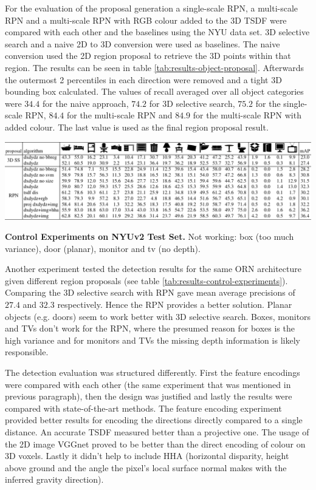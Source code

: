 \documentclass[12pt]{scrartcl}
\begin{document}
For the evaluation of the proposal generation a single-scale RPN, a multi-scale RPN
and a multi-scale RPN with RGB colour added to the 3D TSDF were compared with
each other and the baselines using the NYU data set. 3D selective search
and a naive 2D to 3D conversion were used as baselines. The naive conversion used the
2D region proposal to retrieve the 3D points within that region. The results can
be seen in table \ref{tab:results-object-proposal}. Afterwards the
outermost 2 percentiles in each direction were removed and a tight 3D bounding
box calculated. The values of recall averaged over all object categories were
\(34.4\) for the naive approach, \(74.2\) for 3D selective search, \(75.2\) for
the single-scale RPN, \(84.4\) for the multi-scale RPN and \(84.9\) for the
multi-scale RPN with added colour. The last value is used as the final region
proposal result.

\begin{table}
    \includegraphics[scale=0.85]{results-table-2}
    \caption{\textbf{Control Experiments on NYUv2 Test Set.} Not working:
    box (too much variance), door (planar), monitor and tv (no depth).}
    \label{tab:results-control-experiments}
\end{table}

Another experiment tested the detection results for the same ORN architecture
given different region proposals (see table \ref{tab:results-control-experiments}).
Comparing the 3D selective search with
RPN gave mean average precisions of \(27.4\) and \(32.3\) respectively. Hence
the RPN provides a better solution. Planar objects (e.g. doors) seem to work
better with 3D selective search. Boxes, monitors and TVs don't work for the RPN,
where the presumed reason for boxes is the high variance and for monitors and TVs
the missing depth information is likely responsible.

The detection evaluation was structured differently. First the feature encodings
were compared with each other (the same experiment that was mentioned in previous
paragraph), then the design was justified and lastly the results were compared
with state-of-the-art methods. The feature encoding experiment provided better
results for encoding the directions directly compared to a single distance.
An accurate TSDF measured better than a projective one. The usage of the 2D image
VGGnet proved to be better than the direct encoding of colour on 3D voxels.
Lastly it didn't help to include HHA (horizontal disparity, height above ground
and the angle the pixel's local surface normal makes with the inferred gravity
direction).
\end{document}
